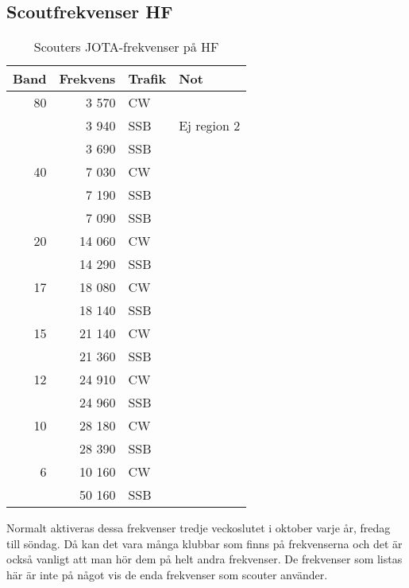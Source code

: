 \subsection{Scoutfrekvenser HF}

\begin{table}[H]
\centering
\begin{tabular}{rrll}
	\textbf{Band} & \textbf{Frekvens} & \textbf{Trafik} & \textbf{Not} \\ \hline
               80 & 3 570  & CW  &             \\
	              & 3 940  & SSB & Ej region 2 \\
	              & 3 690  & SSB &             \\ \hline
	           40 & 7 030  & CW  &             \\
	              & 7 190  & SSB &             \\
	              & 7 090  & SSB &             \\ \hline
	           20 & 14 060 & CW  &             \\
	              & 14 290 & SSB &             \\ \hline
	           17 & 18 080 & CW  &             \\
	              & 18 140 & SSB &             \\ \hline
	           15 & 21 140 & CW  &             \\
	              & 21 360 & SSB &             \\ \hline
	           12 & 24 910 & CW  &             \\
	              & 24 960 & SSB &             \\ \hline
	           10 & 28 180 & CW  &             \\
	              & 28 390 & SSB &             \\ \hline
	            6 & 10 160 & CW  &             \\
	              & 50 160 & SSB &             \\ \hline
\end{tabular}
\caption{Scouters JOTA-frekvenser på HF}
\end{table}

Normalt aktiveras dessa frekvenser tredje veckoslutet i oktober varje år,
fredag till söndag. Då kan det vara många klubbar som finns på frekvenserna
och det är också vanligt att man hör dem på helt andra frekvenser. De
frekvenser som listas här är inte på något vis de enda frekvenser som scouter
använder.
